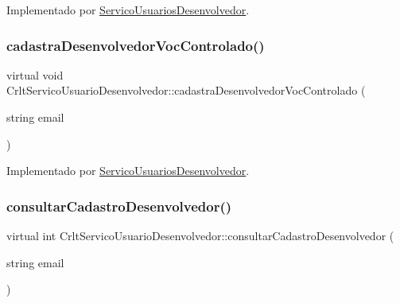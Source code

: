 Implementado por \mbox{\hyperlink{class_servico_usuarios_desenvolvedor_a2dc1811265f101d3ce14150594b25e88}{Servico\+Usuarios\+Desenvolvedor}}.

\mbox{\label{class_crlt_servico_usuario_desenvolvedor_a8eb6d3af46ac497a394882ef0fe32eb1}} 
\subsubsection{\texorpdfstring{cadastra\+Desenvolvedor\+Voc\+Controlado()}{cadastraDesenvolvedorVocControlado()}}
{\footnotesize\ttfamily virtual void Crlt\+Servico\+Usuario\+Desenvolvedor\+::cadastra\+Desenvolvedor\+Voc\+Controlado (\begin{DoxyParamCaption}\item[{string}]{email }\end{DoxyParamCaption})\hspace{0.3cm}{\ttfamily [pure virtual]}}



Implementado por \mbox{\hyperlink{class_servico_usuarios_desenvolvedor_a1708877c02739b2447862b2e2349267d}{Servico\+Usuarios\+Desenvolvedor}}.

\mbox{\label{class_crlt_servico_usuario_desenvolvedor_ad0e0d85a9a4763960f021fca4cf36f29}} 
\subsubsection{\texorpdfstring{consultar\+Cadastro\+Desenvolvedor()}{consultarCadastroDesenvolvedor()}}
{\footnotesize\ttfamily virtual int Crlt\+Servico\+Usuario\+Desenvolvedor\+::consultar\+Cadastro\+Desenvolvedor (\begin{DoxyParamCaption}\item[{string}]{email }\end{DoxyParamCaption})\hspace{0.3cm}{\ttfamily [pure virtual]}}



